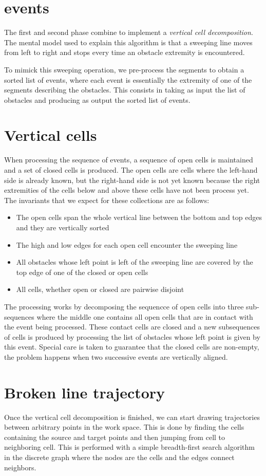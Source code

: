 \documentclass{easychair}
\begin{document}
\section{events}
The first and second phase combine to implement a {\em vertical cell decomposition}.
The mental model used to explain this algorithm is that a sweeping line moves from
left to right and stops every time an obstacle extremity is encountered.

To mimick this sweeping operation, we pre-process the segments
to obtain a sorted list of events, where each event is essentially the extremity
of one of the segments describing the obstacles.  This consists in taking as input
the list of obstacles and producing as output the sorted list of events.
\section{Vertical cells}
When processing the sequence of events, a sequence of open cells is maintained and a set
of closed cells is produced.  The open cells are cells where
the left-hand side is already known, but the right-hand side is not yet known because
the right extremities of the cells below and above these cells have not been process
yet.  The invariants that we expect for these collections are as follows:
\begin{itemize}
\item The open cells span the whole vertical line between the bottom and top edges
and they are vertically sorted
\item The high and low edges for each open cell encounter the sweeping line
\item All obstacles whose left point is left of the sweeping line are covered by the
top edge of one of the closed or open cells
\item All cells, whether open or closed are pairwise disjoint
\end{itemize}
The processing works by decomposing the sequencce of open cells into three sub-sequences
where the middle one contains all open cells that are in contact with the event being
processed.  These contact cells are closed and a new subsequences of cells is produced by
processing the list of obstacles whose left point is given by this event.  Special care
is taken to guarantee that the closed cells are non-empty, the problem happens when
two successive events are vertically aligned.
\section{Broken line trajectory}
Once the vertical cell decomposition is finished, we can start drawing trajectories
between arbitrary points in the work space.  This is done by finding the cells containing
the source and target points and then jumping from cell to neighboring
cell.  This is performed with a simple breadth-first search algorithm in the discrete graph
where the nodes are the cells and the edges connect neighbors.
\end{document}
